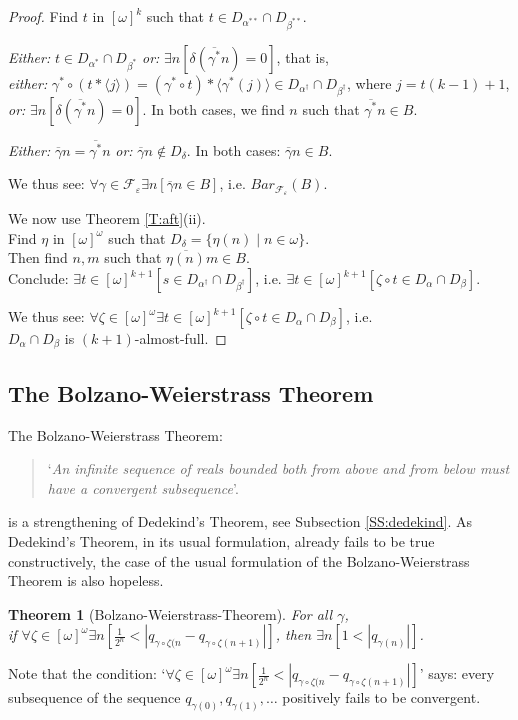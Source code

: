 \documentclass[a4paper]{amsart}
\theoremstyle{plain}
\newtheorem{theorem}{Theorem}
\begin{document}
\begin{proof}
	
	Find $t$ in $[\omega]^k$ such that $t \in D_{\alpha^{\ast\ast}} \cap D_{\beta^{\ast\ast}}$.  
	
	\textit{Either:} $t \in D_{\alpha^\ast} \cap D_ {\beta^\ast}$ \textit{or:} $\exists n[\delta(\overline{\gamma^\ast}n) = 0]$, that is,
	 \\ \textit{either:} $\gamma^\ast\circ(t\ast\langle j \rangle) = (\gamma^\ast \circ t)\ast \langle \gamma^\ast( j)\rangle \in D_{\alpha^\dag} \cap D_{\beta^\dag}
	 $, where $j = t(k-1) + 1$, \textit{or:} $\exists n[\delta(\overline{\gamma^\ast} n) = 0]$. In both cases, we find $n$ such that $\overline {\gamma^\ast} n \in B$.
	  
	   \textit{Either:} $\overline \gamma n = \overline{\gamma^\ast} n$ \textit{or:} $\overline \gamma n \notin D_\delta$. In both cases: $\overline \gamma n \in B$.
	   
	   
	We thus see: $\forall \gamma\in\mathcal{F}_\varepsilon\exists n[\overline\gamma n \in B]$, i.e. $Bar_{\mathcal{F}_\varepsilon}(B)$.
	
	
	\smallskip
	We now use Theorem \ref{T:aft}(ii). \\Find $\eta$ in $[\omega]^\omega$ such that $D_\delta=\{\eta(n)\mid n\in \omega\}$. \\Then find $n,m$ such that $\overline{\eta(n)}m \in B$.  \\Conclude: $\exists t \in [\omega]^{k+1}[s\in D_{\alpha^\dag} \cap D_{\beta^\dag}]$, i.e. $\exists t \in [\omega]^{k+1}[ \zeta\circ t \in D_\alpha\cap D_\beta]$. 
	
	We thus see: $\forall \zeta \in [\omega]^{\omega}\exists t \in [\omega]^{k+1}[ \zeta\circ t \in D_\alpha\cap D_\beta]$, i.e. \\$D_\alpha\cap D_\beta$ is $(k+1)$-almost-full. \end{proof} 
	
	\subsection{The Bolzano-Weierstrass Theorem}\label{SS:bw} The Bolzano-Weierstrass Theorem:\begin{quote}`{\it An infinite sequence of reals bounded both from above and from below must have a convergent subsequence}'. \end{quote} is a strengthening of Dedekind's Theorem, see Subsection \ref{SS:dedekind}.  As Dedekind's Theorem, in its usual formulation, already fails to be true constructively, the case of the usual formulation of the Bolzano-Weierstrass Theorem is also hopeless.\begin{theorem}[Bolzano-Weierstrass-Theorem]\label{T:bolzanow} For all $\gamma$, \\if  $\forall \zeta \in [\omega]^\omega\exists n [ \frac{1}{2^n}<|q_{\gamma\circ\zeta(n} -q_{\gamma\circ\zeta(n+1)}|]$, then $\exists n[ 1<|q_{\gamma(n)}|]$.\end{theorem} 
	Note that the condition: `$\forall \zeta \in [\omega]^\omega\exists n [ \frac{1}{2^n}<|q_{\gamma\circ\zeta(n} -q_{\gamma\circ\zeta(n+1)}|]$' says: every subsequence of the sequence $q_{\gamma(0)}, q_{\gamma(1)}, \ldots$ positively fails to be convergent.
	
\end{document}
